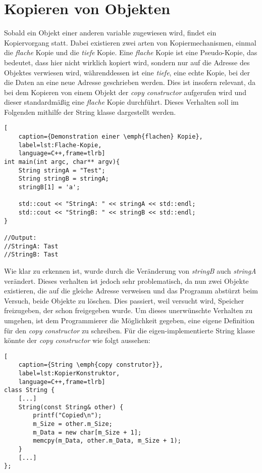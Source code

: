 \section{Kopieren von Objekten}\label{sec:kopieren}
Sobald ein Objekt einer anderen variable zugewiesen wird, findet ein Kopiervorgang statt. Dabei
existieren zwei arten von Kopiermechanismen, einmal die \emph{flache} Kopie und die \emph{tiefe}
Kopie. Eine \emph{flache} Kopie ist eine Pseudo-Kopie, das bedeutet, dass hier nicht wirklich
kopiert wird, sondern nur auf die Adresse des Objektes verwiesen wird, währenddessen ist eine
\emph{tiefe}, eine echte Kopie, bei der die Daten an eine neue Adresse geschrieben werden. Dies
ist insofern relevant, da bei dem Kopieren von einem Objekt der \emph{copy constructor}
aufgerufen wird und dieser standardmäßig eine \emph{flache} Kopie durchführt. Dieses Verhalten
soll im Folgenden mithilfe der String klasse dargestellt werden.

\begin{lstlisting}[
    caption={Demonstration einer \emph{flachen} Kopie},
    label=lst:Flache-Kopie,
    language=C++,frame=tlrb]
int main(int argc, char** argv){
	String stringA = "Test";
	String stringB = stringA;
	stringB[1] = 'a';

	std::cout << "StringA: " << stringA << std::endl;
	std::cout << "StringB: " << stringB << std::endl;
}

//Output:
//StringA: Tast
//StringB: Tast
\end{lstlisting}

Wie klar zu erkennen ist, wurde durch die Veränderung von \emph{stringB} auch \emph{stringA}
verändert. Dieses verhalten ist jedoch sehr problematisch, da nun zwei Objekte existieren, die
auf die gleiche Adresse verweisen und das Programm abstürzt beim Versuch, beide Objekte zu löschen.
Dies passiert, weil versucht wird, Speicher freizugeben, der schon freigegeben wurde.
Um dieses unerwünschte Verhalten zu umgehen, ist dem Programmierer die Möglichkeit gegeben, eine
eigene Definition für den \emph{copy constructor} zu schreiben. Für die eigen-implementierte String
klasse könnte der \emph{copy constructor} wie folgt aussehen:

\begin{lstlisting}[
    caption={String \emph{copy construtor}},
    label=lst:KopierKonstruktor,
    language=C++,frame=tlrb]
class String {
	[...]
    String(const String& other) {
        printf("Copied\n");
        m_Size = other.m_Size;
        m_Data = new char[m_Size + 1];
        memcpy(m_Data, other.m_Data, m_Size + 1);
    }
	[...]
};
\end{lstlisting}

